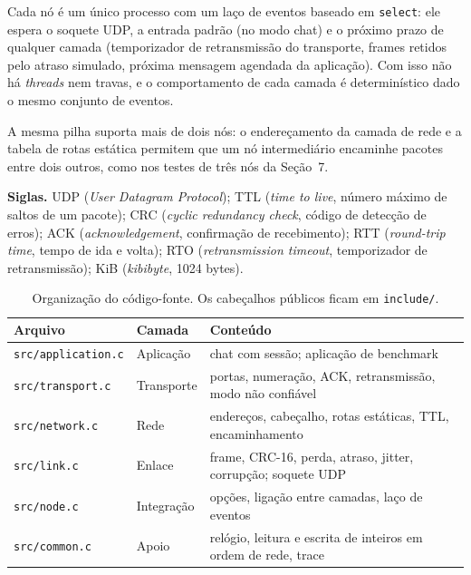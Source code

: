 \documentclass[11pt,a4paper]{article}
\begin{document}
Cada n\'o \'e um \'unico processo com um la\c{c}o de eventos baseado em \texttt{select}: ele espera o soquete UDP, a entrada padr\~ao (no modo chat) e o pr\'oximo prazo de qualquer camada (temporizador de retransmiss\~ao do transporte, frames retidos pelo atraso simulado, pr\'oxima mensagem agendada da aplica\c{c}\~ao). Com isso n\~ao h\'a \emph{threads} nem travas, e o comportamento de cada camada \'e determin\'istico dado o mesmo conjunto de eventos.

A mesma pilha suporta mais de dois n\'os: o endere\c{c}amento da camada de rede e a tabela de rotas est\'atica permitem que um n\'o intermedi\'ario encaminhe pacotes entre dois outros, como nos testes de tr\^es n\'os da Se\c{c}\~ao~7.

\textbf{Siglas.} UDP (\emph{User Datagram Protocol}); TTL (\emph{time to live}, n\'umero m\'aximo de saltos de um pacote); CRC (\emph{cyclic redundancy check}, c\'odigo de detec\c{c}\~ao de erros); ACK (\emph{acknowledgement}, confirma\c{c}\~ao de recebimento); RTT (\emph{round-trip time}, tempo de ida e volta); RTO (\emph{retransmission timeout}, temporizador de retransmiss\~ao); KiB (\emph{kibibyte}, 1024 bytes).

\begin{table}[H]
\centering\small
\begin{tabular}{lll}
\toprule
\textbf{Arquivo} & \textbf{Camada} & \textbf{Conte\'udo} \\
\midrule
\texttt{src/application.c} & Aplica\c{c}\~ao & chat com sess\~ao; aplica\c{c}\~ao de benchmark \\
\texttt{src/transport.c} & Transporte & portas, numera\c{c}\~ao, ACK, retransmiss\~ao, modo n\~ao confi\'avel \\
\texttt{src/network.c} & Rede & endere\c{c}os, cabe\c{c}alho, rotas est\'aticas, TTL, encaminhamento \\
\texttt{src/link.c} & Enlace & frame, CRC-16, perda, atraso, jitter, corrup\c{c}\~ao; soquete UDP \\
\texttt{src/node.c} & Integra\c{c}\~ao & op\c{c}\~oes, liga\c{c}\~ao entre camadas, la\c{c}o de eventos \\
\texttt{src/common.c} & Apoio & rel\'ogio, leitura e escrita de inteiros em ordem de rede, trace \\
\bottomrule
\end{tabular}
\caption{Organiza\c{c}\~ao do c\'odigo-fonte. Os cabe\c{c}alhos p\'ublicos ficam em \texttt{include/}.}
\end{table}
\end{document}
